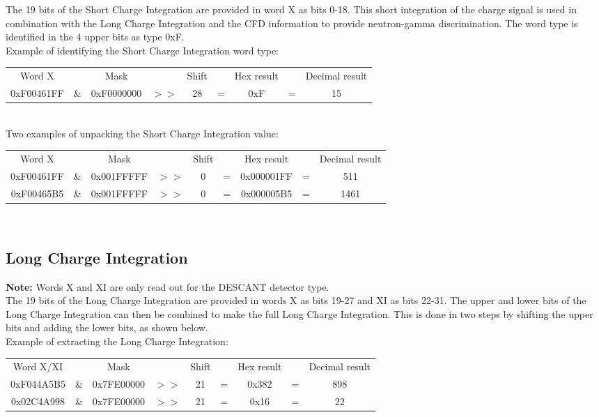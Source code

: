 \documentclass[letterpaper,12pt,notitlepage]{report}
\begin{document}
The 19 bits of the Short Charge Integration are provided in word X as bits 0-18. This short integration of the charge signal is used in combination with the Long Charge Integration and the CFD information to provide neutron-gamma discrimination. The word type is identified in the 4 upper bits as type 0xF.\\

Example of identifying the Short Charge Integration word type:\\

\begin{tabular}{ccccccccc}
Word X &  & Mask & & Shift & & Hex result & & Decimal result\\
0xF00461FF & \& & 0xF0000000 & $>>$ & 28 & = & 0xF & = & 15\\
\end{tabular}\\

Two examples of unpacking the Short Charge Integration value:\\

\begin{tabular}{ccccccccc}
Word X &  & Mask & & Shift & & Hex result & & Decimal result\\
0xF00461FF & \& & 0x001FFFFF & $>>$ & 0 & = & 0x000001FF & = & 511\\
0xF00465B5 & \& & 0x001FFFFF & $>>$ & 0 & = & 0x000005B5 & = & 1461\\
\end{tabular}\\

\subsection{Long Charge Integration}
{\bf Note:} Words X and XI are only read out for the DESCANT detector type.\\

The 19 bits of the Long Charge Integration are provided in words X as bits 19-27 and XI as bits 22-31. The upper and lower bits of the Long Charge Integration can then be combined to make the full Long Charge Integration. This is done in two steps by shifting the upper bits and adding the lower bits, as shown below.\\

Example of extracting the Long Charge Integration:\\

\begin{tabular}{ccccccccc}
Word X/XI &  & Mask & & Shift & & Hex result & & Decimal result\\
0xF044A5B5 & \& & 0x7FE00000 & $>>$ & 21 & = & 0x382 & = & 898\\
0x02C4A998 & \& & 0x7FE00000 & $>>$ & 21 & = & 0x16 & = & 22\\
\end{tabular}\\
\end{document}
